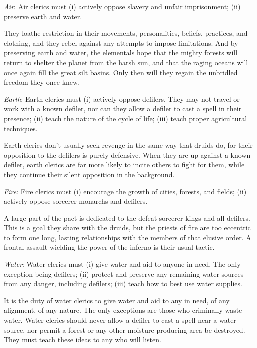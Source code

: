 \begin{figure}[b!]
\end{figure}

\textit{Air}: Air clerics must
	(i) actively oppose slavery and unfair imprisonment;
	(ii) preserve earth and water.

They loathe restriction in their movements, personalities, beliefs, practices, and clothing, and they rebel against any attempts to impose limitations. And by preserving earth and water, the elementals hope that the mighty forests will return to shelter the planet from the harsh sun, and that the raging oceans will once again fill the great silt basins. Only then will they regain the unbridled freedom they once knew.

\textit{Earth}: Earth clerics must
	(i) actively oppose defilers. They may not travel or work with a known defiler, nor can they allow a defiler to cast a spell in their presence;
	(ii) teach the nature of the cycle of life;
	(iii) teach proper agricultural techniques.

Earth clerics don't usually seek revenge in the same way that druids do, for their opposition to the defilers is purely defensive. When they are up against a known defiler, earth clerics are far more likely to incite others to fight for them, while they continue their silent opposition in the background.

\textit{Fire}: Fire clerics must
	(i) encourage the growth of cities, forests, and fields;
	(ii) actively oppose sorcerer-monarchs and defilers.

A large part of the pact is dedicated to the defeat sorcerer-kings and all defilers. This is a goal they share with the druids, but the priests of fire are too eccentric to form one long, lasting relationships with the members of that elusive order. A frontal assault wielding the power of the inferno is their usual tactic.

\textit{Water}: Water clerics must
	(i) give water and aid to anyone in need. The only exception being defilers;
	(ii) protect and preserve any remaining water sources from any danger, including defilers;
	(iii) teach how to best use water supplies.

It is the duty of water clerics to give water and aid to any in need, of any alignment, of any nature. The only exceptions are those who criminally waste water. Water clerics should never allow a defiler to cast a spell near a water source, nor permit a forest or any other moisture producing area be destroyed. They must teach these ideas to any who will listen.

